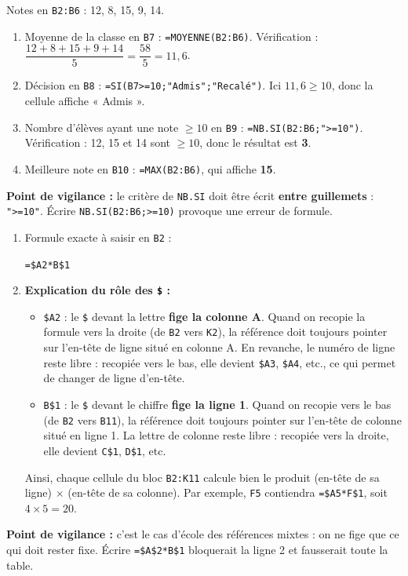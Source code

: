 \documentclass[11pt]{article}
\newcommand{\cle}[1]{{\popxbold\color{popdark}#1}}
\begin{document}
\begin{corrige}
Notes en \texttt{B2:B6} : 12, 8, 15, 9, 14.
\begin{enumerate}
    \item Moyenne de la classe en \texttt{B7} : \texttt{=MOYENNE(B2:B6)}. Vérification : $\dfrac{12+8+15+9+14}{5} = \dfrac{58}{5} = 11,6$.
    \item Décision en \texttt{B8} : \texttt{=SI(B7>=10;"Admis";"Recalé")}. Ici $11,6 \ge 10$, donc la cellule affiche « Admis ».
    \item Nombre d'élèves ayant une note $\ge 10$ en \texttt{B9} : \texttt{=NB.SI(B2:B6;">=10")}. Vérification : 12, 15 et 14 sont $\ge 10$, donc le résultat est \textbf{3}.
    \item Meilleure note en \texttt{B10} : \texttt{=MAX(B2:B6)}, qui affiche \textbf{15}.
\end{enumerate}
\textbf{Point de vigilance :} le critère de \texttt{NB.SI} doit être écrit \textbf{entre guillemets} : \texttt{">=10"}. Écrire \texttt{NB.SI(B2:B6;>=10)} provoque une erreur de formule.
\end{corrige}

\begin{corrige}
\begin{enumerate}
    \item Formule exacte à saisir en \texttt{B2} :
    \begin{center}\texttt{=\$A2*B\$1}\end{center}
    \item \textbf{Explication du rôle des \texttt{\$} :}
    \begin{itemize}
        \item \texttt{\$A2} : le \texttt{\$} devant la lettre \textbf{fige la colonne A}. Quand on recopie la formule vers la droite (de \texttt{B2} vers \texttt{K2}), la référence doit toujours pointer sur l'en-tête de ligne situé en colonne A. En revanche, le numéro de ligne reste libre : recopiée vers le bas, elle devient \texttt{\$A3}, \texttt{\$A4}, etc., ce qui permet de changer de ligne d'en-tête.
        \item \texttt{B\$1} : le \texttt{\$} devant le chiffre \textbf{fige la ligne 1}. Quand on recopie vers le bas (de \texttt{B2} vers \texttt{B11}), la référence doit toujours pointer sur l'en-tête de colonne situé en ligne 1. La lettre de colonne reste libre : recopiée vers la droite, elle devient \texttt{C\$1}, \texttt{D\$1}, etc.
    \end{itemize}
    Ainsi, chaque cellule du bloc \texttt{B2:K11} calcule bien le produit (en-tête de sa ligne) $\times$ (en-tête de sa colonne). Par exemple, \texttt{F5} contiendra \texttt{=\$A5*F\$1}, soit $4 \times 5 = 20$.
\end{enumerate}
\textbf{Point de vigilance :} c'est le cas d'école des \cle{références mixtes} : on ne fige que ce qui doit rester fixe. Écrire \texttt{=\$A\$2*B\$1} bloquerait la ligne 2 et fausserait toute la table.
\end{corrige}
\end{document}
